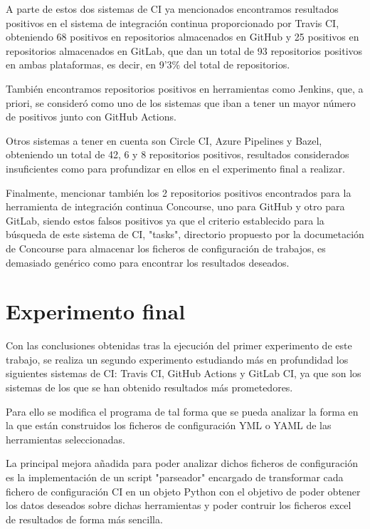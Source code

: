 A parte de estos dos sistemas de CI ya mencionados encontramos resultados positivos en el sistema de integración continua proporcionado por Travis CI, obteniendo 68 positivos en repositorios almacenados en GitHub y 25 positivos en repositorios almacenados en GitLab, que dan un total de 93 repositorios positivos en ambas plataformas, es decir, en 9'3\% del total de repositorios.

También encontramos repositorios positivos en herramientas como Jenkins, que, a priori, se consideró como uno de los sistemas que iban a tener un mayor número de positivos junto con GitHub Actions.

Otros sistemas a tener en cuenta son Circle CI, Azure Pipelines y Bazel, obteniendo un total de 42, 6 y 8 repositorios positivos, resultados considerados insuficientes como para profundizar en ellos en el experimento final a realizar.

Finalmente, mencionar también los 2 repositorios positivos encontrados para la herramienta de integración continua Concourse, uno para GitHub y otro para GitLab, siendo estos falsos positivos ya que el criterio establecido para la búsqueda de este sistema de CI, "tasks", directorio propuesto por la documetación de Concourse para almacenar los ficheros de configuración de trabajos, es demasiado genérico como para encontrar los resultados deseados.

\section{Experimento final}
Con las conclusiones obtenidas tras la ejecución del primer experimento de este trabajo, se realiza un segundo experimento estudiando más en profundidad los siguientes sistemas de CI: Travis CI, GitHub Actions y GitLab CI, ya que son los sistemas de los que se han obtenido resultados más prometedores.

Para ello se modifica el programa de tal forma que se pueda analizar la forma en la que están construidos los ficheros de configuración YML o YAML de las herramientas seleccionadas.

La principal mejora añadida para poder analizar dichos ficheros de configuración es la implementación de un script "parseador" encargado de transformar cada fichero de configuración CI en un objeto Python con el objetivo de poder obtener los datos deseados sobre dichas herramientas y poder contruir los ficheros excel de resultados de forma más sencilla.

